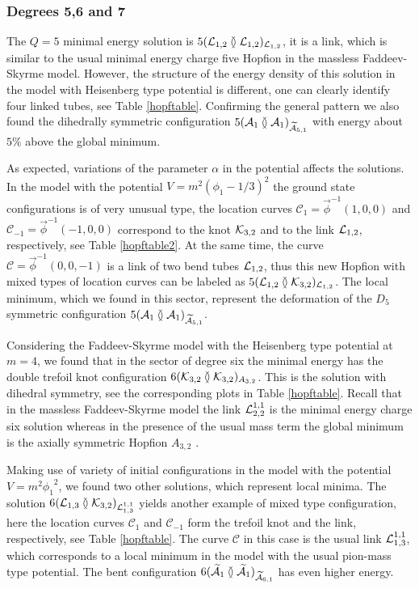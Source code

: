 \documentclass[12pt,a4paper]{article}
\begin{document}
\subsubsection{Degrees 5,6 and 7}

The $Q=5$ minimal energy solution is $5(\mathcal{L}_{1,2}\between\mathcal{L}_{1,2})_{\mathcal{L}_{1,2}}$, it is a link, which is similar
to the usual minimal energy charge five Hopfion in the massless Faddeev-Skyrme model. However, the structure of the energy density
of this solution in the model with Heisenberg type potential is different, one can clearly identify four linked tubes, see
Table \ref{hopftable}. Confirming the general pattern we also found the dihedrally symmetric configuration
$5(\mathcal{A}_1\between\mathcal{A}_1)_{\widetilde{\mathcal{A}}_{5,1}}$ with energy about $5 \%$ above the global minimum.

As expected, variations of the parameter $\alpha$ in the potential  affects the solutions. In the model with
the potential $V=m^2(\phi_1-1/3)^2$  the ground state configurations is of very unusual type, the location curves
$\mathcal{C}_1 = \vec \phi^{-1}(1,0,0)$ and $\mathcal{C}_{-1} = \vec \phi^{-1}(-1,0,0)$ correspond to the knot $\mathcal{K}_{3,2}$ and to the
link $\mathcal{L}_{1,2}$, respectively, see Table \ref{hopftable2}. At the same time, the curve $\mathcal{C} = \vec \phi^{-1}(0,0,-1)$
is a link of two bend tubes $\mathcal{L}_{1,2}$, thus this new Hopfion with mixed types of location curves can be labeled as
$5(\mathcal{L}_{1,2}\between\mathcal{K}_{3,2})_{\mathcal{L}_{1,2}}$. The local minimum, which we found in this sector, represent the deformation
of the $D_5$ symmetric configuration $5(\mathcal{A}_1\between\mathcal{A}_1)_{\widetilde{\mathcal{A}}_{5,1}}$.

Considering the Faddeev-Skyrme model with the Heisenberg type potential at $m=4$, we found that in the
sector of degree six the minimal energy has the
double trefoil knot configuration  $6(\mathcal{K}_{3,2}\between\mathcal{K}_{3,2})_{A_{3,2}}$.
This is the solution with dihedral
symmetry, see the corresponding plots in Table \ref{hopftable}.
Recall that in the massless Faddeev-Skyrme model the link $\mathcal{L}_{2,2}^{1,1}$ is the minimal energy charge six solution
\cite{Sutcliffe:2007ui} whereas in the presence of the usual mass term the global minimum is the axially symmetric
Hopfion $A_{3,2}$ \cite{Battye:2013xf,Harland:2013uk}.

Making use of variety of initial configurations in the model with the potential
$V=m^2{\phi_1}^2$, we found two other solutions, which represent local minima. The solution
$6(\mathcal{L}_{1,3}\between\mathcal{K}_{3,2})_{\mathcal{L}_{1,3}^{1,1}}$ yields another example of mixed type configuration, here the
location curves $\mathcal{C}_1$  and $\mathcal{C}_{-1}$ form the trefoil knot and the link, respectively, see
Table \ref{hopftable}. The curve  $\mathcal{C}$ in this case is the usual link $\mathcal{L}_{1,3}^{1,1}$, which corresponds to
a local minimum in the model with the usual pion-mass type potential. The bent configuration
$6(\widetilde{\mathcal{A}}_1\between\widetilde{\mathcal{A}}_1)_{\widetilde{\mathcal{A}}_{6,1}}$ has even higher energy.
\end{document}
